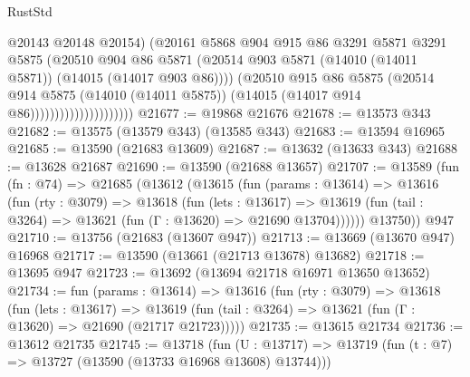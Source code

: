 \begin{lexlean}{RustStd}
\begin{coremodule}
                                      @20143
                                      @20148
                                      @20154)
                                    (@20161
                                      @5868
                                      @904
                                      @915
                                      @86
                                      @3291
                                      @5871
                                      @3291
                                      @5875
                                      (@20510
                                        @904
                                        @86
                                        @5871
                                        (@20514
                                          @903
                                          @5871
                                          (@14010 (@14011 @5871))
                                          (@14015 (@14017 @903 @86))))
                                      (@20510
                                        @915
                                        @86
                                        @5875
                                        (@20514
                                          @914
                                          @5875
                                          (@14010 (@14011 @5875))
                                          (@14015 (@14017 @914 @86)))))))))))))))))))))
@21677 := @19868 @21676
@21678 := @13573 @343
@21682 := @13575 (@13579 @343) (@13585 @343)
@21683 := @13594 @16965
@21685 := @13590 (@21683 @13609)
@21687 := @13632 (@13633 @343)
@21688 := @13628 @21687
@21690 := @13590 (@21688 @13657)
@21707 := @13589
    (fun (fn : @74) =>
    @21685
      (@13612
        (@13615
          (fun (params : @13614) =>
          @13616
            (fun (rty : @3079) =>
            @13618
              (fun (lets : @13617) =>
              @13619 (fun (tail : @3264) => @13621 (fun (Γ : @13620) => @21690 @13704))))))
        @13750))
    @947
@21710 := @13756 (@21683 (@13607 @947))
@21713 := @13669 (@13670 @947) @16968
@21717 := @13590 (@13661 (@21713 @13678) @13682)
@21718 := @13695 @947
@21723 := @13692 (@13694 @21718 @16971 @13650 @13652)
@21734 := fun (params : @13614) =>
  @13616
    (fun (rty : @3079) =>
    @13618
      (fun (lets : @13617) =>
      @13619 (fun (tail : @3264) => @13621 (fun (Γ : @13620) => @21690 (@21717 @21723)))))
@21735 := @13615 @21734
@21736 := @13612 @21735
@21745 := @13718
    (fun (U : @13717) => @13719 (fun (t : @7) => @13727 (@13590 (@13733 @16968 @13608) @13744)))

\end{coremodule}
\end{lexlean}
